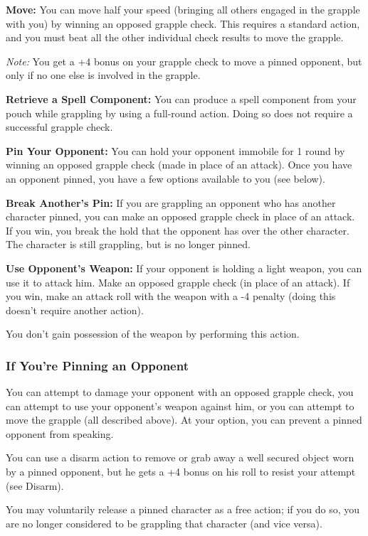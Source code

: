 \textbf{Move:} You can move half your speed (bringing all others engaged in the 
grapple with you) by winning an opposed grapple check. This requires a standard 
action, and you must beat all the other individual check results to move the grapple.

\textit{Note:} You get a +4 bonus on your grapple check to move a pinned opponent, 
but only if no one else is involved in the grapple.

\textbf{Retrieve a Spell Component:} You can produce a spell component from your 
pouch while grappling by using a full-round action. Doing so does not require a 
successful grapple check.

\textbf{Pin Your Opponent:} You can hold your opponent immobile for 1 round by 
winning an opposed grapple check (made in place of an attack). Once you have an 
opponent pinned, you have a few options available to you (see below).

\textbf{Break Another's Pin:} If you are grappling an opponent who has another 
character pinned, you can make an opposed grapple check in place of an attack. 
If you win, you break the hold that the opponent has over the other character. 
The character is still grappling, but is no longer pinned.

\textbf{Use Opponent's Weapon:} If your opponent is holding a light weapon, you 
can use it to attack him. Make an opposed grapple check (in place of an attack). 
If you win, make an attack roll with the weapon with a -4 penalty (doing this doesn't 
require another action).

You don't gain possession of the weapon by performing this action.

\subsubsection{If You're Pinning an Opponent}

You can attempt to damage your opponent with an opposed grapple check, you can 
attempt to use your opponent's weapon against him, or you can attempt to move the 
grapple (all described above). At your option, you can prevent a pinned opponent 
from speaking.

You can use a disarm action to remove or grab away a well secured object worn by 
a pinned opponent, but he gets a +4 bonus on his roll to resist your attempt (see 
Disarm).

You may voluntarily release a pinned character as a free action; if you do so, 
you are no longer considered to be grappling that character (and vice versa).

